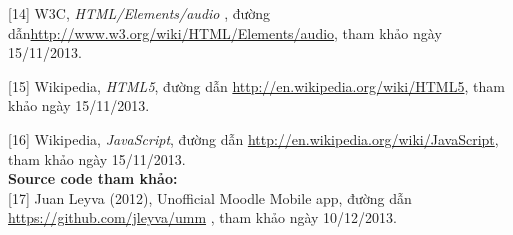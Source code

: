 [14] W3C, \textit{HTML/Elements/audio} , đường dẫn\url{http://www.w3.org/wiki/HTML/Elements/audio}, tham khảo ngày 15/11/2013.

[15] Wikipedia, \textit{HTML5}, đường dẫn \url{http://en.wikipedia.org/wiki/HTML5}, tham khảo ngày 15/11/2013.

[16] Wikipedia, \textit{JavaScript}, đường dẫn \url{http://en.wikipedia.org/wiki/JavaScript}, tham khảo ngày 15/11/2013. \\

\textbf{Source code tham khảo:}\\

[17] Juan Leyva (2012), Unofficial Moodle Mobile app, đường dẫn \url{https://github.com/jleyva/umm} , tham khảo ngày 10/12/2013.


